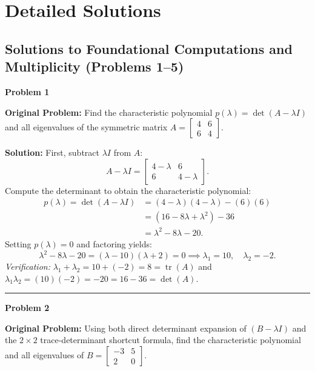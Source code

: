 \documentclass[11pt, letterpaper]{article}
\theoremstyle{definition}
\theoremstyle{remark}
\begin{document}
\newpage

\section{Detailed Solutions}

\subsection{Solutions to Foundational Computations and Multiplicity (Problems 1--5)}

\noindent\textbf{Problem 1}

\textbf{Original Problem:} Find the characteristic polynomial $p(\lambda) = \det(A - \lambda I)$ and all eigenvalues of the symmetric matrix $A = \begin{bmatrix} 4 & 6 \\ 6 & 4 \end{bmatrix}$.

\textbf{Solution:} First, subtract $\lambda I$ from $A$:
\[
A - \lambda I = \begin{bmatrix} 4 - \lambda & 6 \\ 6 & 4 - \lambda \end{bmatrix}.
\]
Compute the determinant to obtain the characteristic polynomial:
\begin{align*}
p(\lambda) = \det(A - \lambda I) &= (4 - \lambda)(4 - \lambda) - (6)(6) \\
&= (16 - 8\lambda + \lambda^2) - 36 \\
&= \lambda^2 - 8\lambda - 20.
\end{align*}
Setting $p(\lambda) = 0$ and factoring yields:
\[
\lambda^2 - 8\lambda - 20 = (\lambda - 10)(\lambda + 2) = 0 \implies \lambda_1 = 10, \quad \lambda_2 = -2.
\]
\textit{Verification:} $\lambda_1 + \lambda_2 = 10 + (-2) = 8 = \operatorname{tr}(A)$ and $\lambda_1 \lambda_2 = (10)(-2) = -20 = 16 - 36 = \det(A)$.

\noindent\rule{\textwidth}{0.4pt}

\noindent\textbf{Problem 2}

\textbf{Original Problem:} Using both direct determinant expansion of $(B - \lambda I)$ and the $2 \times 2$ trace-determinant shortcut formula, find the characteristic polynomial and all eigenvalues of $B = \begin{bmatrix} -3 & 5 \\ 2 & 0 \end{bmatrix}$.
\end{document}
